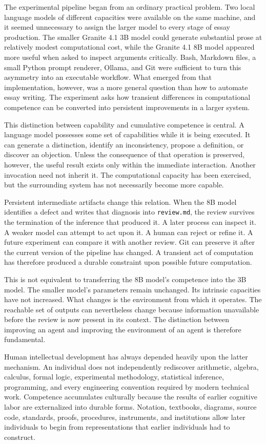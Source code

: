 \documentclass[11pt]{article}
\begin{document}
The experimental pipeline began from an ordinary practical problem. Two local language models of different capacities were available on the same machine, and it seemed unnecessary to assign the larger model to every stage of essay production. The smaller Granite 4.1 3B model could generate substantial prose at relatively modest computational cost, while the Granite 4.1 8B model appeared more useful when asked to inspect arguments critically. Bash, Markdown files, a small Python prompt renderer, Ollama, and Git were sufficient to turn this asymmetry into an executable workflow. What emerged from that implementation, however, was a more general question than how to automate essay writing. The experiment asks how transient differences in computational competence can be converted into persistent improvements in a larger system.

This distinction between capability and cumulative competence is central. A language model possesses some set of capabilities while it is being executed. It can generate a distinction, identify an inconsistency, propose a definition, or discover an objection. Unless the consequence of that operation is preserved, however, the useful result exists only within the immediate interaction. Another invocation need not inherit it. The computational capacity has been exercised, but the surrounding system has not necessarily become more capable.

Persistent intermediate artifacts change this relation. When the 8B model identifies a defect and writes that diagnosis into \texttt{review.md}, the review survives the termination of the inference that produced it. A later process can inspect it. A weaker model can attempt to act upon it. A human can reject or refine it. A future experiment can compare it with another review. Git can preserve it after the current version of the pipeline has changed. A transient act of computation has therefore produced a durable constraint upon possible future computation.

This is not equivalent to transferring the 8B model's competence into the 3B model. The smaller model's parameters remain unchanged. Its intrinsic capacities have not increased. What changes is the environment from which it operates. The reachable set of outputs can nevertheless change because information unavailable before the review is now present in its context. The distinction between improving an agent and improving the environment of an agent is therefore fundamental.

Human intellectual development has always depended heavily upon the latter mechanism. An individual does not independently rediscover arithmetic, algebra, calculus, formal logic, experimental methodology, statistical inference, programming, and every engineering convention required by modern technical work. Competence accumulates culturally because the results of earlier cognitive labor are externalized into durable forms. Notation, textbooks, diagrams, source code, standards, proofs, procedures, instruments, and institutions allow later individuals to begin from representations that earlier individuals had to construct.
\end{document}
